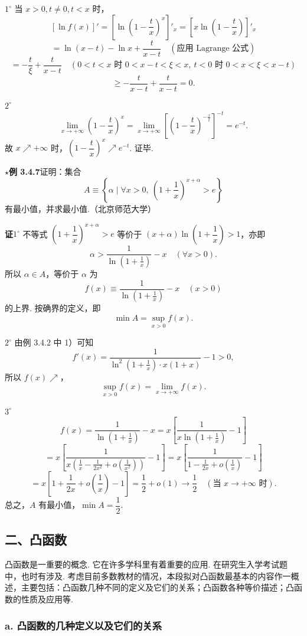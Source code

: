 \documentclass[UTF8,12pt,a4paper,fontset=fandol]{ctexart}
\begin{document}
$1^\circ$ 当 $x>0,t\ne0,t<x$ 时，
\[
  [\ln f(x)]'=\left[\ln\left(1-\frac tx\right)^x\right]'_x
  =\left[x\ln\left(1-\frac tx\right)\right]'_x
\]
\[
  =\ln(x-t)-\ln x+\frac{t}{x-t}\quad(\text{应用 Lagrange 公式})
\]
\[
  =-\frac{t}{\xi}+\frac{t}{x-t}
  \quad(0<t<x\text{ 时 }0<x-t<\xi<x,\ t<0\text{ 时 }0<x<\xi<x-t)
\]
\[
  \ge -\frac{t}{x-t}+\frac{t}{x-t}=0.
\]

$2^\circ$
\[
  \lim_{x\to+\infty}\left(1-\frac tx\right)^x
  =\lim_{x\to+\infty}\left[\left(1-\frac tx\right)^{-\frac xt}\right]^{-t}
  =e^{-t}.
\]
故 $x\nearrow+\infty$ 时，$\left(1-\dfrac tx\right)^x\nearrow e^{-t}$. 证毕.

\noindent\textbf{$\star$例 3.4.7}\quad 证明：集合
\[
  A\equiv\left\{\alpha\mid \forall x>0,\ \left(1+\frac1x\right)^{x+\alpha}>e\right\}
\]
有最小值，并求最小值.（北京师范大学）

\noindent\textbf{证}\quad $1^\circ$ 不等式 $\left(1+\dfrac1x\right)^{x+\alpha}>e$ 等价于 $(x+\alpha)\ln\left(1+\dfrac1x\right)>1$，亦即
\[
  \alpha>\frac1{\ln\left(1+\frac1x\right)}-x\quad(\forall x>0).
\]
所以 $\alpha\in A$，等价于 $\alpha$ 为
\[
  f(x)\equiv\frac1{\ln\left(1+\frac1x\right)}-x\quad(x>0)
\]
的上界. 按确界的定义，即
\[
  \min A=\sup_{x>0}f(x).
\]

$2^\circ$ 由例 3.4.2 中 1）可知
\[
  f'(x)=\frac1{\ln^2\left(1+\frac1x\right)\cdot x(1+x)}-1>0,
\]
所以 $f(x)\nearrow$，
\[
  \sup_{x>0}f(x)=\lim_{x\to+\infty}f(x).
\]

$3^\circ$
\[
  f(x)=\frac1{\ln\left(1+\frac1x\right)}-x
  =x\left[\frac1{x\ln\left(1+\frac1x\right)}-1\right]
\]
\[
  =x\left[\frac1{x\left(\frac1x-\frac1{2x^2}+o\left(\frac1{x^2}\right)\right)}-1\right]
  =x\left[\frac1{1-\frac1{2x}+o\left(\frac1x\right)}-1\right]
\]
\[
  =x\left[1+\frac1{2x}+o\left(\frac1x\right)-1\right]
  =\frac12+o(1)\to\frac12\quad(\text{当 }x\to+\infty\text{ 时}).
\]
总之，$A$ 有最小值，$\min A=\dfrac12$.

\subsection*{二、凸函数}

凸函数是一重要的概念. 它在许多学科里有着重要的应用. 在研究生入学考试题中，也时有涉及. 考虑目前多数教材的情况，本段拟对凸函数最基本的内容作一概述，主要包括：凸函数几种不同的定义及它们的关系；凸函数各种等价描述；凸函数的性质及应用等.

\subsubsection*{a. 凸函数的几种定义以及它们的关系}
\end{document}
